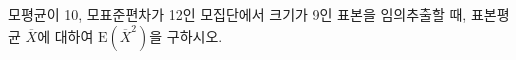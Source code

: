 모평균이 10, 모표준편차가 12인 모집단에서 크기가 9인 표본을 임의추출할 때, 표본평균 $\overline{X}$에 대하여 $\mathrm{E}(\overline{X}^2)$을 구하시오.
